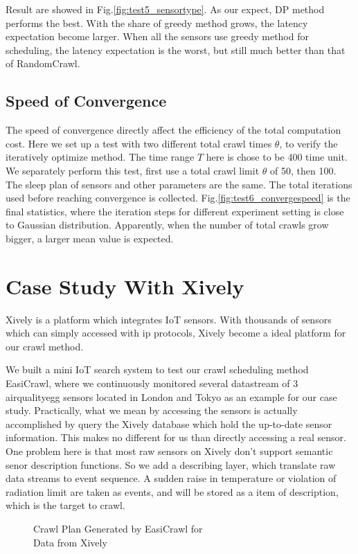 \documentclass[conference]{IEEEtran}
\begin{document}
Result are showed in Fig.\ref{fig:test5_sensortype}. As our expect, DP method performs the best. With the share of greedy method grows, the latency expectation become larger. When all the sensors use greedy method for scheduling, the latency expectation is the worst, but still much better than that of RandomCrawl.

\subsection{Speed of Convergence}
The speed of convergence directly affect the efficiency of the total computation cost. Here we set up a test with two different total crawl times $\theta$, to verify the iteratively optimize method. The time range $T$ here is chose to be 400 time unit. We separately perform this test, first use a total crawl limit $\theta$ of 50, then 100. The sleep plan of sensors and other parameters are the same. The total iterations used before reaching convergence is collected.
Fig.\ref{fig:test6_convergespeed} is the final statistics, where the iteration steps for different experiment setting is close to Gaussian distribution. Apparently, when the number of total crawls grow bigger, a larger mean value is expected.

\section{Case Study With Xively} \label{case_study}

Xively is a platform which integrates IoT sensors. With thousands of sensors which can simply accessed with ip protocols, Xively become a ideal platform for our crawl method.


We built a mini IoT search system to test our crawl scheduling method EasiCrawl, where we continuously monitored several datastream of 3 airqualityegg\cite{airegg} sensors located in London and Tokyo as an example for our case study. 
Practically, what we mean by accessing the sensors is actually accomplished by query the Xively database which hold the up-to-date sensor information. This makes no different for us than directly accessing a real sensor. One problem here is that most raw sensors on Xively don't support semantic senor description functions. So we add a describing layer, which translate raw data streams to event sequence. A sudden raise in temperature or violation of radiation limit are taken as events, and will be stored as a item of description, which is the target to crawl.
\begin{figure}
	\centering
	
	\captionsetup{justification=centering}
	\caption{Crawl Plan Generated by EasiCrawl for \\
		Data from Xively}
	\label{fig:xivelycasestudy}
\end{figure}
\end{document}
